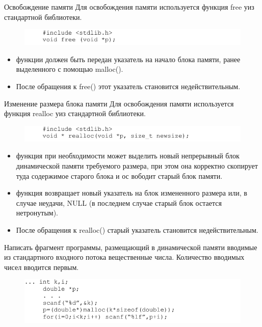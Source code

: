 \documentclass{beamer}
\begin{document}
\begin{frame}{Освобождение памяти}
Для освобождения памяти используется функция free уиз стандартной библиотеки.
\begin{figure}[h]
\centering
\includegraphics[scale=0.6]{images/lec04-pic13.png}
\end{figure}
\begin{itemize}
\item функции должен быть передан указатель на начало блока памяти,
ранее выделенного с помощью malloc(). 
\item После обращения к free() этот указатель становится недействительным.
\end{itemize}
\end{frame}

\begin{frame}{Изменение размера блока памяти}
Для освобождения памяти используется функция realloc уиз стандартной библиотеки.
\begin{figure}[h]
\centering
\includegraphics[scale=0.6]{images/lec04-pic14.png}
\end{figure}
\begin{itemize}
\item функция при необходимости может выделить новый непрерывный блок динамической памяти требуемого размера, при этом она корректно скопирует туда содержимое старого блока и ос вободит старый блок памяти. 
\item функция возвращает новый указатель на блок измененного размера или, в случае неудачи, NULL (в последнем случае старый блок остается нетронутым). 
\item После обращения к realloc() старый указатель становится недействительным.
\end{itemize}
\end{frame}

\begin{frame}
Написать фрагмент программы, размещающий в динамической памяти вводимые из стандартного входного потока вещественные числа. Количество вводимых чисел вводится первым.
\begin{figure}[h]
\centering
\includegraphics[scale=0.6]{images/lec04-pic15.png}
\end{figure}
\end{frame}
\end{document}
